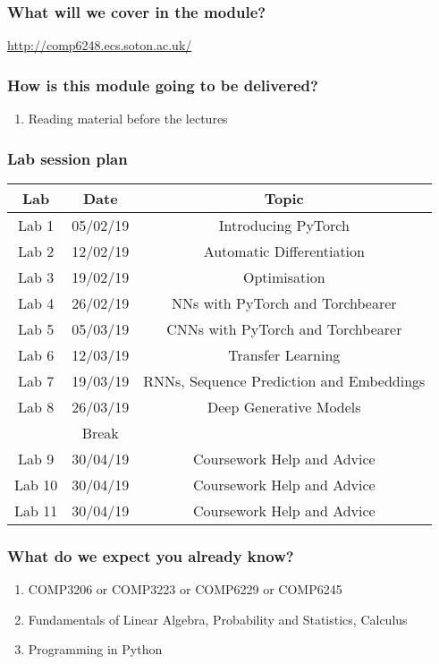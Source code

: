 \documentclass[\beamerclass]{beamer}
\begin{document}
\begin{frame}
	\frametitle{What will we cover in the module?}
	\url{http://comp6248.ecs.soton.ac.uk/}
\end{frame}

\begin{frame}
	\frametitle{How is this module going to be delivered?}
	
	\begin{enumerate}
	\item Reading material before the lectures
	\end{enumerate}
\end{frame}

\begin{frame}
	\frametitle{Lab session plan}
	
	\begin{center}
	\begin{tabular}{ c c c }
		 Lab & Date & Topic \\ \hline
		 Lab 1 &  05/02/19 & Introducing PyTorch \\ 
		 Lab 2 & 12/02/19 & Automatic Differentiation \\  
		 Lab 3 & 19/02/19 & Optimisation   \\
		 Lab 4 & 26/02/19 & NNs with PyTorch and Torchbearer   \\
 		Lab 5 & 05/03/19 & CNNs with PyTorch and Torchbearer   \\
 		Lab 6 & 12/03/19 & Transfer Learning \\
 		Lab 7 & 19/03/19 & RNNs, Sequence Prediction and Embeddings \\
		 Lab 8 & 26/03/19 & Deep Generative Models\\ \hline 
		 & Break & \\
		 \hline
		 Lab 9 & 30/04/19 & Coursework Help and Advice \\
		 Lab 10 & 30/04/19 & Coursework Help and Advice \\
 		 Lab 11 & 30/04/19 & Coursework Help and Advice \\
	\end{tabular}
	\end{center}
\end{frame}

\begin{frame}
	\frametitle{What do we expect you already know?}
	
	\begin{enumerate}
	\item COMP3206 or COMP3223 or COMP6229 or COMP6245
	\item Fundamentals of Linear Algebra, Probability and Statistics, Calculus
	\item Programming in Python
	\end{enumerate}
\end{frame}
\end{document}
